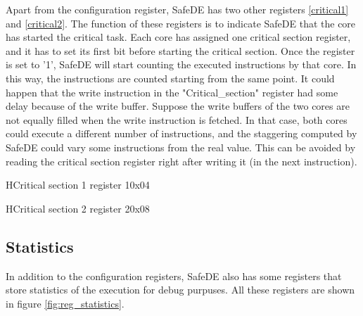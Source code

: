 Apart from the  configuration register, SafeDE has two other registers \ref{critical1} and \ref{critical2}. The function of these registers is to indicate SafeDE that the core has started the critical task. Each core has assigned one critical section register, and it has to set its first bit before starting the critical section. Once the register is set to '1', SafeDE will start counting the executed instructions by that core. In this way, the instructions are counted starting from the same point. It could happen that the write instruction in the "Critical\_section" register had some delay because of the write buffer. Suppose the write buffers of the two cores are not equally filled when the write instruction is fetched. In that case, both cores could execute a different number of instructions, and the staggering computed by SafeDE could vary some instructions from the real value. This can be avoided by reading the critical section register right after writing it (in the next instruction).

\begin{register}{H}{Critical section 1 register 1}{0x04}
	\label{critical1}
	\regnewline
\end{register}

\begin{register}{H}{Critical section 2 register 2}{0x08}
	\label{critical2}
	\regnewline
\end{register}

\hspace{1cm}




\newpage
\subsection{Statistics}

In addition to the configuration registers, SafeDE also has some registers that store statistics of the execution for debug purpuses. All these registers are shown in figure \ref{fig:reg_statistics}.

